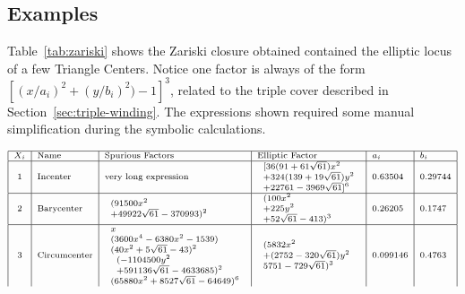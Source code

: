 \subsection{Examples}

Table~\ref{tab:zariski} shows the Zariski closure obtained contained the elliptic locus of a few Triangle Centers. Notice one factor is always of the form $[(x/a_i)^2+(y/b_i)^2)-1]^3$, related to the triple cover described in Section~\ref{sec:triple-winding}. The expressions shown required some manual simplification during the symbolic calculations. 

\begin{table}
$$
\scriptsize
\begin{array}{|c|l|l|l|l|l|}
\hline
X_i & \text{Name} & \text{Spurious Factors} & \text{Elliptic Factor} & a_i & b_i \\
\hline
1 & \text{Incenter} & \text{very long expression} & \begin{array}{l}
[36 (91 + 61 \sqrt{61}) x^2 \\
+ 324 (139 + 19 \sqrt{61}) y^2 \\
+ 22761 - 3969 \sqrt{61}]^6
\end{array} & 0.63504 & 0.29744 \\
\hline
2 & \text{Barycenter} & \begin{array}{l} (91500x^2\\
+49922\sqrt{61}-370993)^2 \end{array} & \begin{array}{l} (100x^2\\+225y^2\\
+52\sqrt{61}-413)^3 \end{array} & 0.26205 & 0.1747 \\
\hline
3 & \text{Circumcenter} & \begin{array}{l}
x\\(3600 x^4-6380 x^2-1539)\\
(40 x^2+5\sqrt{61}-43)^2\\
\begin{array}{l}
(-1104500 y^2\\+591136\sqrt{61}-4633685)^2\end{array}\\
(65880x^2+8527\sqrt{61}-64649)^6 \end{array} & \begin{array}{l}
(5832 x^2\\
+(2752-320\sqrt{61}) y^2\\5751-729\sqrt{61})^3 \end{array} & 0.099146 & 0.4763\\

\end{array}$$
\end{table}
